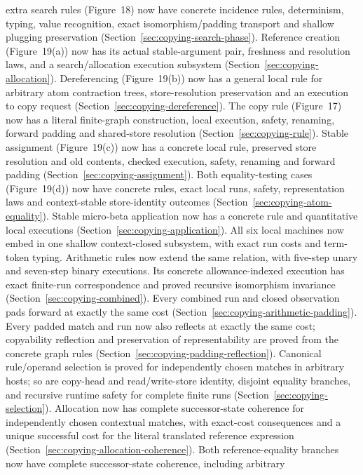 \begin{enumerate}
extra search rules (Figure~18) now have concrete incidence rules, determinism,
typing, value recognition, exact isomorphism/padding transport and shallow
plugging preservation (Section~\ref{sec:copying-search-phase}). Reference creation (Figure~19(a)) now has its actual stable-argument pair,
freshness and resolution laws, and a search/allocation execution subsystem
(Section~\ref{sec:copying-allocation}). Dereferencing (Figure~19(b)) now has a
general local rule for arbitrary atom contraction trees, store-resolution
preservation and an execution to copy request
(Section~\ref{sec:copying-dereference}). The copy rule (Figure~17) now has a literal finite-graph construction,
local execution, safety, renaming, forward padding and shared-store resolution
(Section~\ref{sec:copying-rule}). Stable assignment (Figure~19(c)) now has a
concrete local rule, preserved store resolution and old contents, checked
execution, safety, renaming and forward padding
(Section~\ref{sec:copying-assignment}). Both equality-testing cases (Figure~19(d)) now have concrete rules,
exact local runs, safety, representation laws and context-stable store-identity
outcomes (Section~\ref{sec:copying-atom-equality}). Stable micro-beta application now has a concrete rule and quantitative local
executions (Section~\ref{sec:copying-application}). All six local machines now embed in one shallow context-closed subsystem,
with exact run costs and term-token typing. Arithmetic rules now extend the
same relation, with five-step unary and seven-step binary executions. Its concrete allowance-indexed
execution has exact finite-run correspondence and proved recursive
isomorphism invariance (Section~\ref{sec:copying-combined}). Every combined run
and closed observation pads forward at exactly the same cost
(Section~\ref{sec:copying-arithmetic-padding}). Every padded match and run now
also reflects at exactly the same cost; copyability reflection and preservation
of representability are proved from the concrete graph rules
(Section~\ref{sec:copying-padding-reflection}). Canonical rule/operand selection
is proved for independently chosen matches in arbitrary hosts; so are copy-head
and read/write-store identity, disjoint equality branches, and recursive
runtime safety for complete finite runs (Section~\ref{sec:copying-selection}).
Allocation now has complete successor-state coherence for independently
chosen contextual matches, with exact-cost consequences and a unique successful
cost for the literal translated reference expression
(Section~\ref{sec:copying-allocation-coherence}). Both reference-equality
branches now have complete successor-state coherence, including arbitrary

\end{enumerate}
